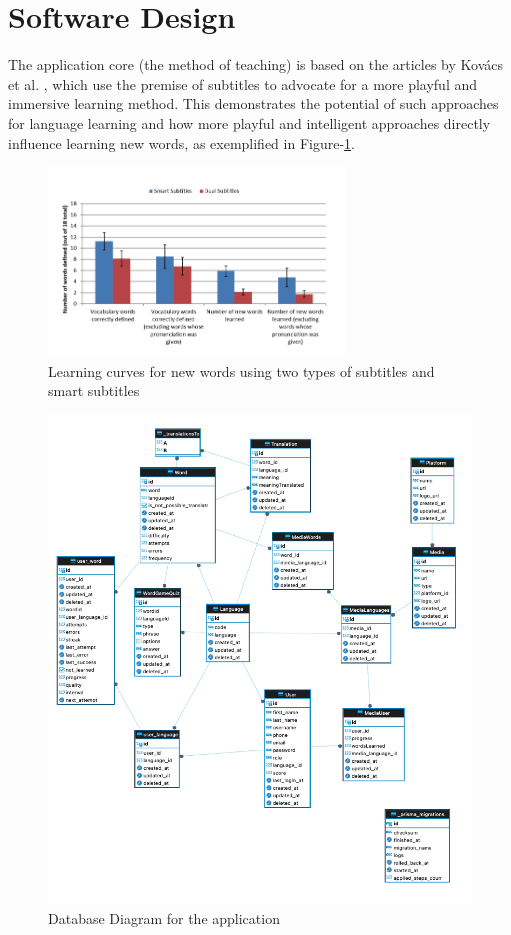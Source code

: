 \documentclass[12pt]{article}
\begin{document}
\section{Software Design}
The application core (the method of teaching) is based on the articles by Kovács et al. \cite{Kovacs14}, which use the premise of subtitles to advocate for a more playful and immersive learning method. This demonstrates the potential of such approaches for language learning and how more playful and intelligent approaches directly influence learning new words, as exemplified in Figure-\ref{fig:my_label}. \\
\begin{figure}[!h]
\centering
\caption{Learning curves for new words using two types of subtitles and smart subtitles}
\label{fig:my_label}
\includegraphics[width=0.7\textwidth]{assets/3.png}
\end{figure} 
\begin{figure}[!h]
  \centering
  \caption{
  Database Diagram for the application
  }
  \label{fig:database_diagram}
  \includegraphics[width=1\textwidth]{assets/23.png}
\end{figure}
\end{document}
